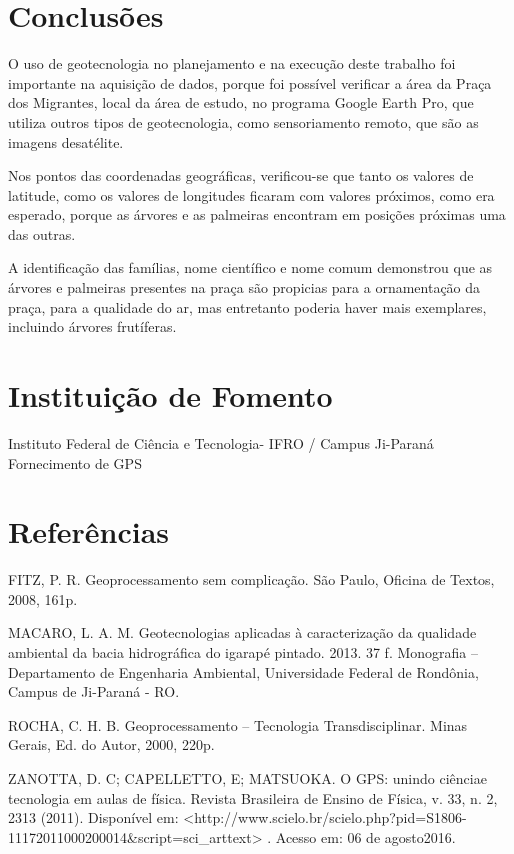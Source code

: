 \documentclass[article,12pt,onesidea,4paper,english,brazil]{abntex2}
\begin{document}
	
	\section*{Conclusões}
	
O uso de geotecnologia no planejamento e na execução deste trabalho foi importante na aquisição de dados, porque foi possível verificar a área da Praça dos Migrantes, local da área de estudo, no programa Google Earth Pro, que utiliza outros tipos de geotecnologia, como sensoriamento remoto, que são as imagens desatélite.

Nos pontos das coordenadas geográficas, verificou-se que tanto os valores de latitude, como os valores de longitudes ficaram com valores próximos, como era esperado, porque as árvores e as palmeiras encontram em posições próximas uma das outras.

A identificação das famílias, nome científico e nome comum demonstrou que as árvores e palmeiras presentes na praça são propicias para a ornamentação da praça, para a qualidade do ar, mas entretanto poderia haver mais exemplares, incluindo árvores frutíferas.
	\section*{Instituição de Fomento}
	
Instituto Federal de Ciência e Tecnologia- IFRO / Campus Ji-Paraná Fornecimento de GPS
	
	\section*{Referências}
	

FITZ, P. R. Geoprocessamento sem complicação. São Paulo, Oficina de Textos, 2008, 161p.



\noindent MACARO, L. A. M. Geotecnologias aplicadas à caracterização da qualidade ambiental da bacia hidrográfica do igarapé pintado. 2013. 37 f. Monografia – Departamento de Engenharia Ambiental, Universidade Federal de Rondônia, Campus de Ji-Paraná - RO.

\noindent ROCHA, C. H. B. Geoprocessamento – Tecnologia Transdisciplinar. Minas Gerais, Ed. do Autor, 2000, 220p.

\noindent ZANOTTA, D. C; CAPELLETTO, E; MATSUOKA. O GPS: unindo ciênciae
tecnologia em aulas de física. Revista Brasileira de Ensino de Física, v. 33, n. 2, 2313 (2011). Disponível em: <http://www.scielo.br/scielo.php?pid=S1806-11172011000200014\&script=sci\_arttext> . Acesso em: 06 de agosto2016.



	
\end{document}
